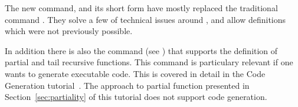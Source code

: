 The new  command, and its short form  have mostly
replaced the traditional  command \cite{slind-tfl}. They solve
a few of technical issues around , and allow definitions
which were not previously possible.

In addition there is also the  command
(see \cite{isabelle-isar-ref}) that supports the definition of partial
and tail recursive functions. This command is particulary relevant if one wants to
generate executable code. This is covered in detail in the Code Generation
tutorial~\cite{Haftmann-codegen}.
The approach to partial function presented in Section~\ref{sec:partiality}
of this tutorial does not support code generation.


